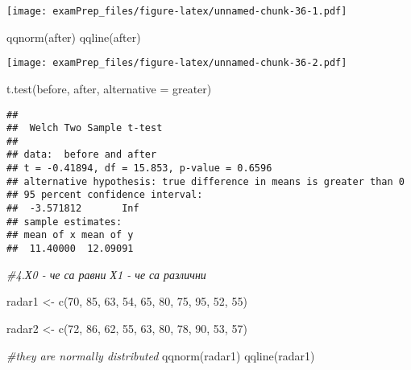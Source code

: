 \documentclass[
]{article}
\newenvironment{Shaded}{\begin{snugshade}}{\end{snugshade}}
\newcommand{\AttributeTok}[1]{\textcolor[rgb]{0.77,0.63,0.00}{#1}}
\newcommand{\CommentTok}[1]{\textcolor[rgb]{0.56,0.35,0.01}{\textit{#1}}}
\newcommand{\DecValTok}[1]{\textcolor[rgb]{0.00,0.00,0.81}{#1}}
\newcommand{\FunctionTok}[1]{\textcolor[rgb]{0.00,0.00,0.00}{#1}}
\newcommand{\NormalTok}[1]{#1}
\newcommand{\OtherTok}[1]{\textcolor[rgb]{0.56,0.35,0.01}{#1}}
\newcommand{\StringTok}[1]{\textcolor[rgb]{0.31,0.60,0.02}{#1}}
\begin{document}
\texttt{[image: examPrep\_files/figure-latex/unnamed-chunk-36-1.pdf]}

\begin{Shaded}
\begin{Highlighting}[]
\FunctionTok{qqnorm}\NormalTok{(after)}
\FunctionTok{qqline}\NormalTok{(after)}
\end{Highlighting}
\end{Shaded}

\texttt{[image: examPrep\_files/figure-latex/unnamed-chunk-36-2.pdf]}

\begin{Shaded}
\begin{Highlighting}[]
\FunctionTok{t.test}\NormalTok{(before, after, }\AttributeTok{alternative =} \StringTok{\textquotesingle{}greater\textquotesingle{}}\NormalTok{)}
\end{Highlighting}
\end{Shaded}

\begin{verbatim}
## 
##  Welch Two Sample t-test
## 
## data:  before and after
## t = -0.41894, df = 15.853, p-value = 0.6596
## alternative hypothesis: true difference in means is greater than 0
## 95 percent confidence interval:
##  -3.571812       Inf
## sample estimates:
## mean of x mean of y 
##  11.40000  12.09091
\end{verbatim}

\begin{Shaded}
\begin{Highlighting}[]
\CommentTok{\#4.Х0 {-} че са равни Х1 {-} че са различни }

\NormalTok{radar1 }\OtherTok{\textless{}{-}} \FunctionTok{c}\NormalTok{(}\DecValTok{70}\NormalTok{, }\DecValTok{85}\NormalTok{, }\DecValTok{63}\NormalTok{, }\DecValTok{54}\NormalTok{, }\DecValTok{65}\NormalTok{, }\DecValTok{80}\NormalTok{, }\DecValTok{75}\NormalTok{, }\DecValTok{95}\NormalTok{, }\DecValTok{52}\NormalTok{, }\DecValTok{55}\NormalTok{)}

\NormalTok{radar2 }\OtherTok{\textless{}{-}} \FunctionTok{c}\NormalTok{(}\DecValTok{72}\NormalTok{, }\DecValTok{86}\NormalTok{, }\DecValTok{62}\NormalTok{, }\DecValTok{55}\NormalTok{, }\DecValTok{63}\NormalTok{, }\DecValTok{80}\NormalTok{, }\DecValTok{78}\NormalTok{, }\DecValTok{90}\NormalTok{, }\DecValTok{53}\NormalTok{, }\DecValTok{57}\NormalTok{)}

\CommentTok{\#they are normally distributed}
\FunctionTok{qqnorm}\NormalTok{(radar1)}
\FunctionTok{qqline}\NormalTok{(radar1)}
\end{Highlighting}
\end{Shaded}
\end{document}
